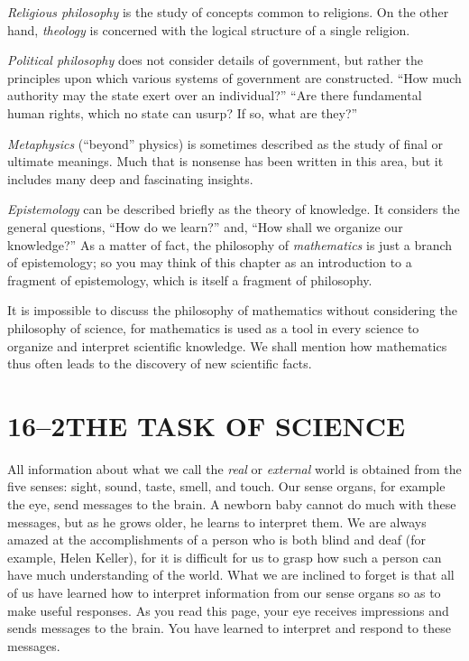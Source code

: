 \documentclass[11pt]{book}
\begin{document}
\emph{Religious philosophy} is the study of concepts common to religions. On
the other hand, \emph{theology} is concerned with the logical structure of a
single religion.

\emph{Political philosophy} does not consider details of government, but
rather the principles upon which various systems of government are
constructed. ``How much authority may the state exert over an individual?''
``Are there fundamental human rights, which no state can usurp? If so, what
are they?''

\emph{Metaphysics} (``beyond'' physics) is sometimes described as the study of
final or ultimate meanings. Much that is nonsense has been written in this
area, but it includes many deep and fascinating insights.

\emph{Epistemology} can be described briefly as the theory of knowledge. It
considers the general questions, ``How do we learn?'' and, ``How shall we
organize our knowledge?'' As a matter of fact, the philosophy of
\emph{mathematics} is just a branch of epistemology; so you may think of this
chapter as an introduction to a fragment of epistemology, which is itself a
fragment of philosophy.

It is impossible to discuss the philosophy of mathematics without considering
the philosophy of science, for mathematics is used as a tool in every science
to organize and interpret scientific knowledge. We shall mention how
mathematics thus often leads to the discovery of new scientific facts.

\section*{16--2\quad THE TASK OF SCIENCE}

All information about what we call the \emph{real} or \emph{external} world is
obtained from the five senses: sight, sound, taste, smell, and touch. Our
sense organs, for example the eye, send messages to the brain. A newborn baby
cannot do much with these messages, but as he grows older, he learns to
interpret them. We are always amazed at the accomplishments of a person who is
both blind and deaf (for example, Helen Keller), for it is difficult for us to
grasp how such a person can have much understanding of the world. What we are
inclined to forget is that all of us have learned how to interpret information
from our sense organs so as to make useful responses. As you read this page,
your eye receives impressions and sends messages to the brain. You have
learned to interpret and respond to these messages.
\end{document}
